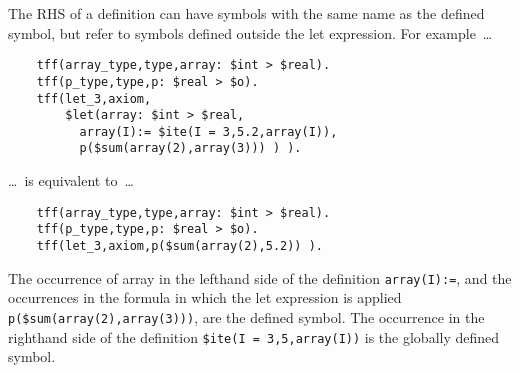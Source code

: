 \documentclass{easychair}
\begin{document}
The RHS of a definition can have symbols with the same name as the defined 
symbol, but refer to symbols defined outside the let expression. 
For example~\ldots
\begin{verbatim}
    tff(array_type,type,array: $int > $real).
    tff(p_type,type,p: $real > $o).
    tff(let_3,axiom,
        $let(array: $int > $real,
          array(I):= $ite(I = 3,5.2,array(I)),
          p($sum(array(2),array(3))) ) ).
\end{verbatim}
\ldots~is equivalent to~\ldots
\begin{verbatim}
    tff(array_type,type,array: $int > $real).
    tff(p_type,type,p: $real > $o).
    tff(let_3,axiom,p($sum(array(2),5.2)) ).
\end{verbatim}
The occurrence of array in the lefthand side of the definition 
{\tt array(I):=}, and the occurrences in the formula in which the let 
expression is applied {\tt p(\$sum(array(2),array(3)))}, are the defined 
symbol. 
The occurrence in the righthand side of the definition 
{\tt \$ite(I = 3,5,array(I))} is the globally defined symbol.
\end{document}
